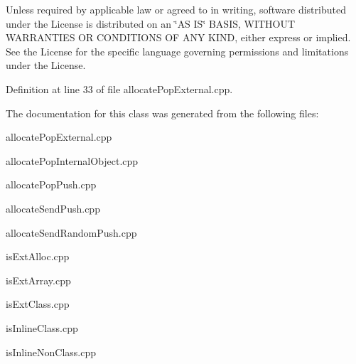 Unless required by applicable law or agreed to in writing, software distributed under the License is distributed on an \char`\"{}\+A\+S I\+S\char`\"{} B\+A\+S\+IS, W\+I\+T\+H\+O\+UT W\+A\+R\+R\+A\+N\+T\+I\+ES OR C\+O\+N\+D\+I\+T\+I\+O\+NS OF A\+NY K\+I\+ND, either express or implied. See the License for the specific language governing permissions and limitations under the License. 

Definition at line 33 of file allocate\+Pop\+External.\+cpp.



The documentation for this class was generated from the following files\+:\begin{DoxyCompactItemize}
\item 
allocate\+Pop\+External.\+cpp\item 
allocate\+Pop\+Internal\+Object.\+cpp\item 
allocate\+Pop\+Push.\+cpp\item 
allocate\+Send\+Push.\+cpp\item 
allocate\+Send\+Random\+Push.\+cpp\item 
is\+Ext\+Alloc.\+cpp\item 
is\+Ext\+Array.\+cpp\item 
is\+Ext\+Class.\+cpp\item 
is\+Inline\+Class.\+cpp\item 
is\+Inline\+Non\+Class.\+cpp\end{DoxyCompactItemize}
